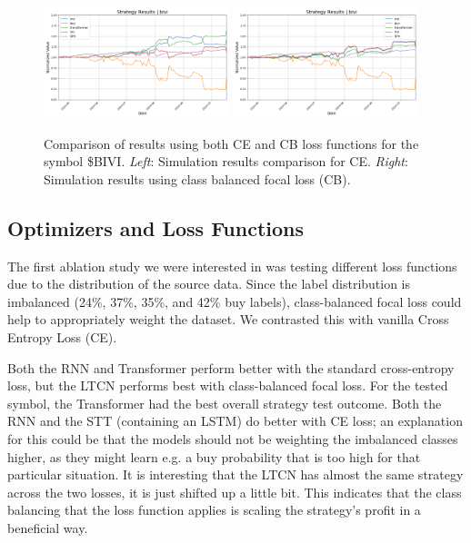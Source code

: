 \documentclass[10pt,twocolumn,letterpaper]{article}
\begin{document}
\begin{figure}[ht!]
    \centering
    \includegraphics[width=0.48\textwidth]{../figures/simulation_results_all_models_bivi_config_loss_ce.yml.png}
    \includegraphics[width=0.48\textwidth]{../figures/simulation_results_all_models_bivi_config_loss_cbfocal.yml.png} 
    \caption{Comparison of results using both CE and CB loss functions for the symbol \$BIVI. \emph{Left}: Simulation results comparison for CE. \emph{Right}: Simulation results using class balanced focal loss (CB).}
    \label{fig:ceVsCbLoss}
\end{figure}

\subsection{Optimizers and Loss Functions}

The first ablation study we were interested in was testing different loss functions due to the distribution of the source data. Since the label distribution is imbalanced (24\%, 37\%, 35\%, and 42\% buy labels), class-balanced focal loss could help to appropriately weight the dataset\cite{cb_focal}. We contrasted this with vanilla Cross Entropy Loss (CE).

Both the RNN and Transformer perform better with the standard cross-entropy loss, but the LTCN performs best with class-balanced focal loss. For the tested symbol, the Transformer had the best overall strategy test outcome. Both the RNN and the STT (containing an LSTM) do better with CE loss; an explanation for this could be that the models should not be weighting the imbalanced classes higher, as they might learn e.g. a buy probability that is too high for that particular situation. It is interesting that the LTCN has almost the same strategy across the two losses, it is just shifted up a little bit. This indicates that the class balancing that the loss function applies is scaling the strategy's profit in a beneficial way.
\end{document}
